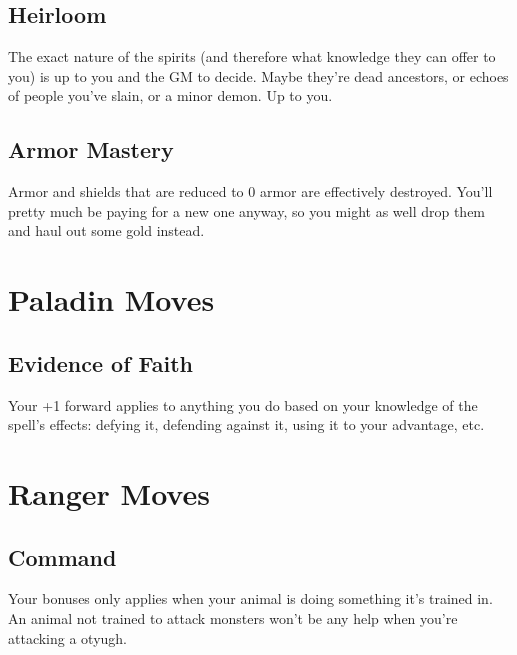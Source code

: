        
\subsection{Heirloom}   
       

The exact nature of the spirits (and therefore what knowledge they can offer to you) is up to you and the GM to decide. Maybe they're dead ancestors, or echoes of people you've slain, or a minor demon. Up to you.

       
\subsection{Armor Mastery}    
       

Armor and shields that are reduced to 0 armor are effectively destroyed. You'll pretty much be paying for a new one anyway, so you might as well drop them and haul out some gold instead.

       
\section{Paladin Moves}    
       
\subsection{Evidence of Faith}    
       

Your +1 forward applies to anything you do based on your knowledge of the spell's effects: defying it, defending against it, using it to your advantage, etc.

       
\section{Ranger Moves}    
       
\subsection{Command}   
       

Your bonuses only applies when your animal is doing something it's trained in. An animal not trained to attack monsters won't be any help when you're attacking a otyugh.

